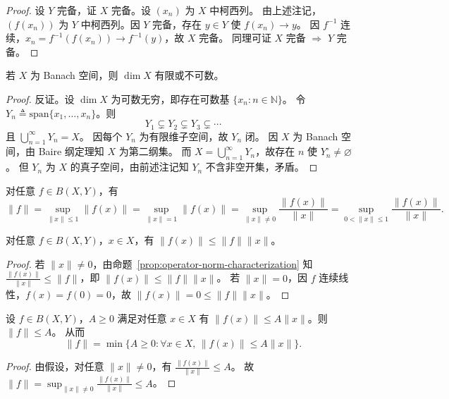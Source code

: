 \documentclass[lang=cn,a4paper,newtx,section]{elegantbook}
\begin{document}
\begin{proof}
  设 $Y$ 完备，证 $X$ 完备。设 $(x_n)$ 为 $X$ 中柯西列。
  由上述注记，$(f(x_n))$ 为 $Y$ 中柯西列。因 $Y$ 完备，存在 $y\in Y$ 使 $f(x_n)\to y$。
  因 $f^{-1}$ 连续，$x_n=f^{-1}(f(x_n))\to f^{-1}(y)$，故 $X$ 完备。
  同理可证 $X$ 完备 $\Rightarrow$ $Y$ 完备。
\end{proof}

\begin{proposition}
  若 $X$ 为 Banach 空间，则 $\dim X$ 有限或不可数。
\end{proposition}

\begin{proof}
  反证。设 $\dim X$ 为可数无穷，即存在可数基 $\{x_n:n\in\mathbb{N}\}$。
  令 $Y_n\triangleq\mathrm{span}\{x_1,\ldots,x_n\}$。则
  \[
    Y_1\subsetneq Y_2\subsetneq Y_3\subsetneq\cdots
  \]
  且 $\bigcup_{n=1}^{\infty}Y_n=X$。
  因每个 $Y_n$ 为有限维子空间，故 $Y_n$ 闭。
  因 $X$ 为 Banach 空间，由 Baire 纲定理知 $X$ 为第二纲集。
  而 $X=\bigcup_{n=1}^{\infty}Y_n$，故存在 $n$ 使 $Y_n^\circ\ne\varnothing$。
  但 $Y_n$ 为 $X$ 的真子空间，由前述注记知 $Y_n$ 不含非空开集，矛盾。
\end{proof}

\begin{proposition}\label{prop:operator-norm-characterization}
  对任意 $f\in B(X,Y)$，有
  \[
    \|f\|=\sup_{\|x\|\le 1}\|f(x)\|=\sup_{\|x\|=1}\|f(x)\|=\sup_{\|x\|\ne 0}\frac{\|f(x)\|}{\|x\|}=\sup_{0<\|x\|\le 1}\frac{\|f(x)\|}{\|x\|}.
  \]
\end{proposition}

\begin{proposition}
  对任意 $f\in B(X,Y)$，$x\in X$，有 $\|f(x)\|\le\|f\|\|x\|$。
\end{proposition}

\begin{proof}
  若 $\|x\|\ne 0$，由命题~\ref{prop:operator-norm-characterization} 知 $\frac{\|f(x)\|}{\|x\|}\le\|f\|$，即 $\|f(x)\|\le\|f\|\|x\|$。
  若 $\|x\|=0$，因 $f$ 连续线性，$f(x)=f(0)=0$，故 $\|f(x)\|=0\le\|f\|\|x\|$。
\end{proof}

\begin{proposition}
  设 $f\in B(X,Y)$，$A\ge 0$ 满足对任意 $x\in X$ 有 $\|f(x)\|\le A\|x\|$。则 $\|f\|\le A$。
  从而
  \[
    \|f\|=\min\{A\ge 0:\forall x\in X,\,\|f(x)\|\le A\|x\|\}.
  \]
\end{proposition}

\begin{proof}
  由假设，对任意 $\|x\|\ne 0$，有 $\frac{\|f(x)\|}{\|x\|}\le A$。
  故 $\|f\|=\sup_{\|x\|\ne 0}\frac{\|f(x)\|}{\|x\|}\le A$。
\end{proof}
\end{document}
